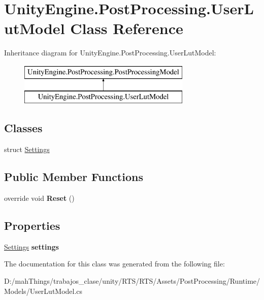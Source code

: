 \hypertarget{class_unity_engine_1_1_post_processing_1_1_user_lut_model}{}\section{Unity\+Engine.\+Post\+Processing.\+User\+Lut\+Model Class Reference}
\label{class_unity_engine_1_1_post_processing_1_1_user_lut_model}
Inheritance diagram for Unity\+Engine.\+Post\+Processing.\+User\+Lut\+Model\+:\begin{figure}[H]
\begin{center}
\leavevmode
\includegraphics[height=2.000000cm]{class_unity_engine_1_1_post_processing_1_1_user_lut_model}
\end{center}
\end{figure}
\subsection*{Classes}
\begin{DoxyCompactItemize}
\item 
struct \mbox{\hyperlink{struct_unity_engine_1_1_post_processing_1_1_user_lut_model_1_1_settings}{Settings}}
\end{DoxyCompactItemize}
\subsection*{Public Member Functions}
\begin{DoxyCompactItemize}
\item 
\mbox{\label{class_unity_engine_1_1_post_processing_1_1_user_lut_model_af9a480ba07bbcd8c4863610c30e2e1f7}} 
override void {\bfseries Reset} ()
\end{DoxyCompactItemize}
\subsection*{Properties}
\begin{DoxyCompactItemize}
\item 
\mbox{\label{class_unity_engine_1_1_post_processing_1_1_user_lut_model_a0fb6df59627b12d97cf28efb64ae8033}} 
\mbox{\hyperlink{struct_unity_engine_1_1_post_processing_1_1_user_lut_model_1_1_settings}{Settings}} {\bfseries settings}
\end{DoxyCompactItemize}


The documentation for this class was generated from the following file\+:\begin{DoxyCompactItemize}
\item 
D\+:/mah\+Things/trabajos\+\_\+clase/unity/\+R\+T\+S/\+R\+T\+S/\+Assets/\+Post\+Processing/\+Runtime/\+Models/User\+Lut\+Model.\+cs\end{DoxyCompactItemize}
